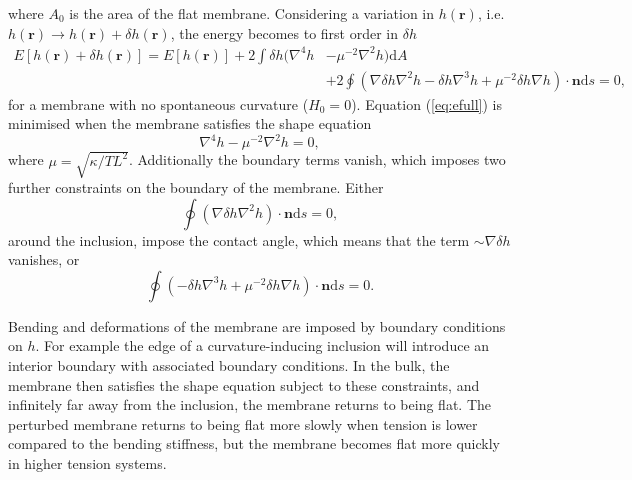 where $A_0$ is the area of the flat membrane. Considering a variation in $h(\textbf{r})$, i.e. $h(\textbf{r})\rightarrow h(\textbf{r})+\delta h(\textbf{r})$, the energy becomes to first order in $\delta h$
\begin{equation}
\begin{split}
    E[h(\textbf{r})+\delta h(\textbf{r})] = E[h(\textbf{r})] + 2\int \delta h (\nabla^4 h &- \mu^{-2}\nabla^2 h) \text{d}A \\
    &+ 2\oint\left(\nabla \delta h \nabla^2 h - \delta h \nabla^3 h + \mu^{-2} \delta h \nabla h \right) \cdot\textbf{n}\text{d}s = 0,
\end{split}
\label{eq:shape_eq}
\end{equation}
for a membrane with no spontaneous curvature ($H_0=0$). Equation (\ref{eq:efull}) is minimised when the membrane satisfies the shape equation
\begin{equation}
    \nabla^4 h - \mu^{-2}\nabla^2 h = 0,
    \label{eq:shape_eq}
\end{equation}
where $\mu=\sqrt{\kappa/TL^2}$. Additionally the boundary terms vanish, which imposes two further constraints on the boundary of the membrane. Either
\begin{equation}
    \oint\left(\nabla \delta h \nabla^2 h\right) \cdot\textbf{n}\text{d}s = 0,
    \label{eq:boundterm1}
\end{equation}
around the inclusion, impose the contact angle, which means that the term $\sim\nabla \delta h$ vanishes, or
\begin{equation}
    \oint\left(- \delta h \nabla^3 h + \mu^{-2} \delta h \nabla h \right) \cdot\textbf{n}\text{d}s = 0.
    \label{eq:boundterm2}
\end{equation}


Bending and deformations of the membrane are imposed by boundary conditions on $h$. For example the edge of a curvature-inducing inclusion will introduce an interior boundary with associated boundary conditions. In the bulk, the membrane then satisfies the shape equation subject to these constraints, and infinitely far away from the inclusion, the membrane returns to being flat. The perturbed membrane returns to being flat more slowly when tension is lower compared to the bending stiffness, but the membrane becomes flat more quickly in higher tension systems.

